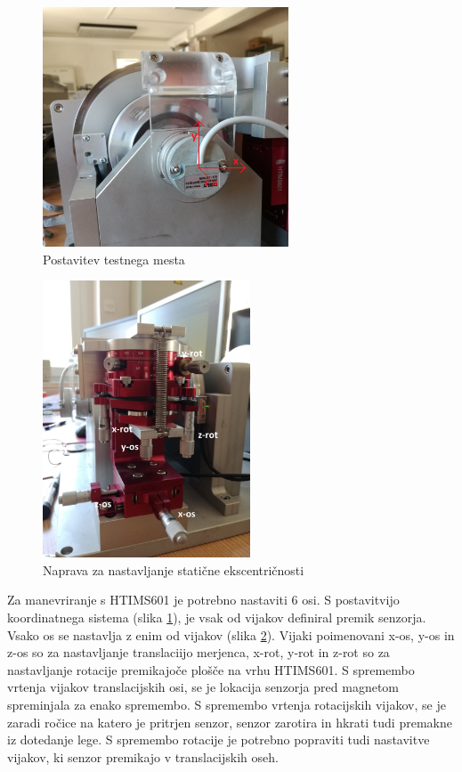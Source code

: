 \begin{figure}[!ht]
	\centering
	\includegraphics[width=0.65\textwidth]{./Slike/koordinatnisistem.jpg}
	\caption{Postavitev testnega mesta}
	\label{koordinatnisistem.jpg}
\end{figure}
\begin{figure}[!ht]
	\centering
	\includegraphics[width=0.55\textwidth]{./Slike/HTIMS601.jpg}
	\caption{Naprava za nastavljanje statične ekscentričnosti}
	\label{HTIMS601.jpg}
\end{figure}
Za manevriranje s HTIMS601 je potrebno nastaviti 6 osi.
S postavitvijo koordinatnega sistema (slika \ref{koordinatnisistem.jpg}), je vsak od vijakov definiral premik senzorja. 
Vsako os se nastavlja z enim od vijakov (slika \ref{HTIMS601.jpg}). Vijaki poimenovani x-os, y-os in z-os so za nastavljanje translaciijo merjenca, x-rot, y-rot in z-rot so za nastavljanje rotacije premikajoče plošče na vrhu HTIMS601.
S spremembo vrtenja vijakov translacijskih osi, se je lokacija senzorja pred magnetom spreminjala za enako spremembo. S spremembo vrtenja rotacijskih vijakov, se je zaradi ročice na katero je pritrjen senzor, senzor zarotira in hkrati tudi premakne iz dotedanje lege. S spremembo rotacije je potrebno popraviti tudi nastavitve vijakov, ki senzor premikajo v translacijskih oseh.

